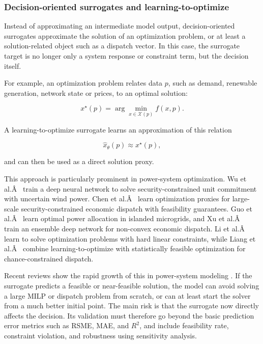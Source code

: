 \documentclass[final,5p,times,twocolumn]{elsarticle}
\begin{document}
\subsubsection{Decision-oriented surrogates and learning-to-optimize}
\label{sec:tax:l2o}

Instead of approximating an intermediate model output, decision-oriented
surrogates approximate the solution of an optimization problem, or at
least a solution-related object such as a dispatch vector. In this case,
the surrogate target is no longer only a system response or constraint
term, but the decision itself.

For example, an optimization problem relates data $p$, such as demand,
renewable generation, network state or prices, to an optimal solution:

$$\begin{equation}
 x^{\star}(p) = \arg\min_{x \in \mathcal{X}(p)} f(x,p).
\end{equation}$$

A learning-to-optimize surrogate learns an approximation of this
relation

$$\begin{equation}
 \hat{x}_{\theta}(p) \approx x^{\star}(p),
\end{equation}$$

and can then be used as a direct solution proxy.

This approach is particularly prominent in power-system optimization. Wu
et al.Â~\cite{Wu2022231} train a deep neural network to solve
security-constrained unit commitment with uncertain wind power. Chen et
al.Â~\cite{Chen2022,Chen20244723} learn optimization proxies for
large-scale security-constrained economic dispatch with feasibility
guarantees. Guo et al.Â~\cite{Guo20222057} learn optimal power allocation in
islanded microgrids, and Xu et al.Â~\cite{Xu20223066} train an ensemble deep
network for non-convex economic dispatch. Li et al.Â~\cite{Li202359995} learn
to solve optimization problems with hard linear constraints, while Liang
et al.Â~\cite{Liang20246508} combine learning-to-optimize with statistically
feasible optimization for chance-constrained dispatch.

Recent reviews show the rapid growth of this in power-system modeling
\cite{Khaloie2025,Lim2025,Ruan2021221}. If the surrogate predicts a
feasible or near-feasible solution, the model can avoid solving a large
MILP or dispatch problem from scratch, or can at least start the solver
from a much better initial point. The main risk is that the surrogate
now directly affects the decision. Its validation must therefore go
beyond the basic prediction error metrics such as RSME, MAE, and $R^2$,
and include feasibility rate, constraint violation, and robustness using
sensitivity analysis.
\end{document}
